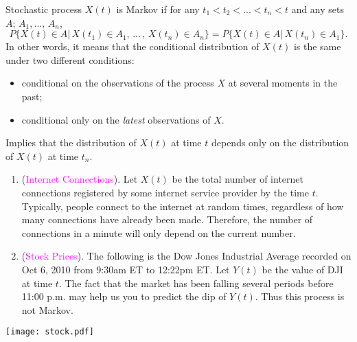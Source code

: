 \documentclass[20pt,landscape]{foils}
\newcommand{\no}{\noindent}
\newcommand{\be}{\begin{enumerate}}
\newcommand{\ee}{\end{enumerate}}
\newcommand{\bc}{\begin{center}}
\newcommand{\ec}{\end{center}}
\newcommand{\bul}{\hspace*{.3in}{\textcolor{red}{$\bullet$ \ }}}
\begin{document}
\foilhead[-.8in]{\textcolor{blue}{Markov processes}}  
\no Stochastic process $X(t)$ is Markov if for any $t_{1}<t_{2}<...<t_{n}<t$
and any sets $A;\, A_{1},...,\, A_{n}$, \[
P\{X(t)\in A|\, X(t_{1})\in A_{1},\,...\,,\, X(t_{n})\in A_{n}\}=P\{X(t)\in A|\, X(t_{n})\in A_{1}\}.\]
In other words, it means that the conditional distribution of $X(t)$
is the same under two different conditions:

\begin{itemize}
\item[\bul] conditional on  the observations of the process $X$ at several moments in the past;
\item[\bul] conditional only on the \emph{latest} observations of $X$.
\end{itemize}
\no Implies that the distribution of $X(t)$ at time $t$ depends only on the distribution of $X(t)$ at time $t_n$.
\foilhead[-.8in]{\textcolor{blue}{Markov processes:Examples}} 
\be
\addtolength{\itemsep}{-0.6\baselineskip}
\item[\bul] ({\textcolor{magenta}{Internet Connections}}). Let $X(t)$ be the total number
of internet connections registered by some internet service provider
by the time $t$. Typically, people connect to the internet at random
times, regardless of how many connections have already been made.
Therefore, the number of connections in a minute will only depend
on the current number.
\item[\bul] ({\textcolor{magenta}{Stock Prices}}). The following is the Dow Jones Industrial
Average recorded on Oct 6, 2010 from 9:30am ET to 12:22pm
ET. Let $Y(t)$ be the value of DJI at time $t$. The fact that the market has been falling several periods before 11:00 p.m. may help us you to predict the dip of $Y(t)$. Thus this process is not Markov.
\ee
\bc
\texttt{[image: stock.pdf]}
\ec
\end{document}
